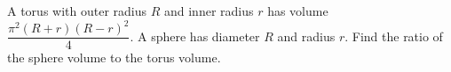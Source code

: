 A torus with outer radius $R$ and inner radius $r$ has volume $\dfrac{\pi^2(R+r)(R-r)^2}{4}$. A sphere has diameter $R$ and radius $r$. Find the ratio of the sphere volume to the torus volume.

